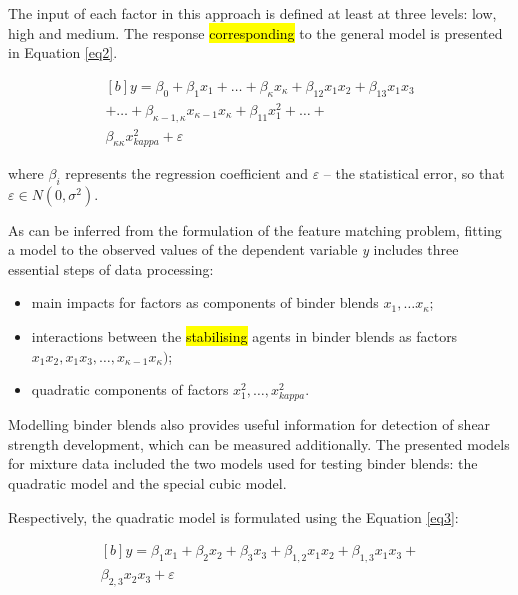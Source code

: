\documentclass[eprint,
]{actapoly}
\begin{document}
The input of each factor in this approach is defined at least at three levels: low, high and medium. The response \hl{corresponding} to the general model is presented in Equation \ref{eq2}.

\begin{equation}\label{eq2}
\begin{aligned}[b]
y=\beta_0+\beta_{1}x_{1}+\ldots+\beta_{\kappa}x_{\kappa}+\beta_{12}x_{1}x_{2}+\beta_{13}x_{1}x_3\\
+\ldots+\beta_{\kappa-1,\kappa}x_{\kappa-1}x_{\kappa}+\beta_{11}x_{1}^2+\ldots+ \\\beta_{\kappa\kappa}x_{kappa}^2+\varepsilon
\end{aligned}
\end{equation}

where $\beta_i$ represents the regression coefficient and $\varepsilon$ -- the statistical error, so that $\varepsilon\in N(0,\sigma^2)$.

As can be inferred from the formulation of the feature matching problem, fitting a model to the observed values of the dependent variable \emph{y} includes three essential steps of data processing: 

\begin{itemize}
	\item main impacts for factors as components of binder blends $x_1, \ldots x_\kappa$;
	\item interactions between the \hl{stabilising} agents in binder blends as factors $x_{1}x_{2}, x_{1}x_{3}, \ldots, x_{\kappa-1}x_{\kappa})$; 
	\item quadratic components of factors $x_{1}^2, \ldots, x_{kappa}^2$. 
\end{itemize}

Modelling binder blends also provides useful information for detection of shear strength development, which can be measured additionally. The presented models for mixture data included the two models used for testing binder blends: the quadratic model and the special cubic model. 

Respectively, the quadratic model is formulated using the Equation \ref{eq3}:

\begin{equation}\label{eq3}
\begin{aligned}[b]
y=\beta_{1}x_{1}+\beta_{2}x_{2}+\beta_{3}x_{3}+\beta_{1,2}x_{1}x_{2}+\beta_{1,3}x_{1}x_{3}+\\\beta_{2,3}x_{2}x_{3}+\varepsilon
\end{aligned}
\end{equation}
\end{document}

